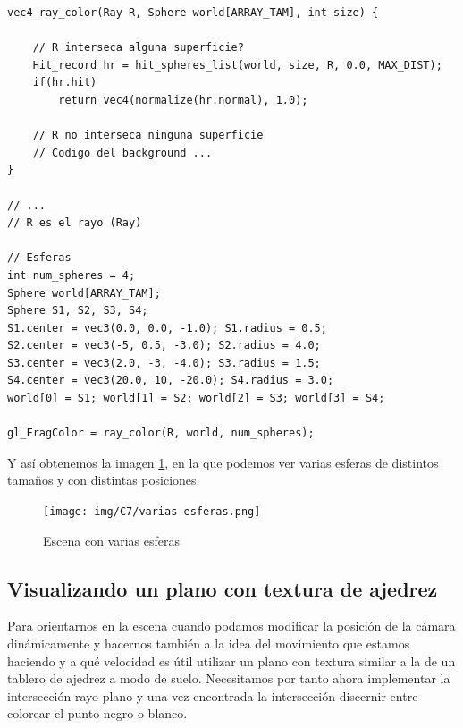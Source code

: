 \begin{lstlisting}
vec4 ray_color(Ray R, Sphere world[ARRAY_TAM], int size) {

    // R interseca alguna superficie?
    Hit_record hr = hit_spheres_list(world, size, R, 0.0, MAX_DIST);
    if(hr.hit)
        return vec4(normalize(hr.normal), 1.0);

    // R no interseca ninguna superficie
    // Codigo del background ... 
}

// ... 
// R es el rayo (Ray)

// Esferas
int num_spheres = 4;
Sphere world[ARRAY_TAM];
Sphere S1, S2, S3, S4;
S1.center = vec3(0.0, 0.0, -1.0); S1.radius = 0.5; 
S2.center = vec3(-5, 0.5, -3.0); S2.radius = 4.0;
S3.center = vec3(2.0, -3, -4.0); S3.radius = 1.5;
S4.center = vec3(20.0, 10, -20.0); S4.radius = 3.0;
world[0] = S1; world[1] = S2; world[2] = S3; world[3] = S4;

gl_FragColor = ray_color(R, world, num_spheres);

\end{lstlisting}

Y así obtenemos la imagen \ref{fig:varias-esferas}, en la que podemos ver varias esferas de distintos tamaños y con distintas posiciones.

\begin{figure} [ht]
    \centering
    \texttt{[image: img/C7/varias-esferas.png]}
    \caption{Escena con varias esferas}
    \label{fig:varias-esferas}
\end{figure}

\subsection{Visualizando un plano con textura de ajedrez}
\label{subsection:plano}

Para orientarnos en la escena cuando podamos modificar la posición de la cámara dinámicamente y hacernos también a la idea del movimiento que estamos haciendo y a qué velocidad es útil utilizar un plano con textura similar a la de un tablero de ajedrez a modo de suelo. Necesitamos por tanto ahora implementar la intersección rayo-plano y una vez encontrada la intersección discernir entre colorear el punto negro o blanco.

